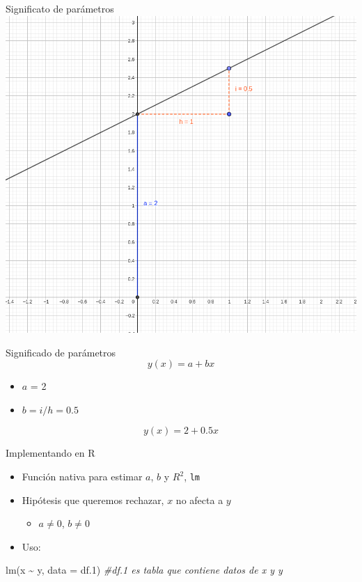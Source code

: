 \documentclass[
  11pt,
  ignorenonframetext,
]{beamer}
\newenvironment{Shaded}{}{}
\newcommand{\AttributeTok}[1]{\textcolor[rgb]{0.49,0.56,0.16}{#1}}
\newcommand{\CommentTok}[1]{\textcolor[rgb]{0.38,0.63,0.69}{\textit{#1}}}
\newcommand{\FloatTok}[1]{\textcolor[rgb]{0.25,0.63,0.44}{#1}}
\newcommand{\FunctionTok}[1]{\textcolor[rgb]{0.02,0.16,0.49}{#1}}
\newcommand{\NormalTok}[1]{#1}
\newcommand{\SpecialCharTok}[1]{\textcolor[rgb]{0.25,0.44,0.63}{#1}}
\providecommand{\tightlist}{%
  \setlength{\itemsep}{0pt}\setlength{\parskip}{0pt}}
\begin{document}
\begin{frame}{Significato de parámetros}
\protect\hypertarget{significato-de-paruxe1metros}{}
\includegraphics{La-recta.png}
\end{frame}

\begin{frame}{Significado de parámetros}
\protect\hypertarget{significado-de-paruxe1metros}{}
\[y(x) = a + bx\]

\begin{itemize}
\item
  \(a\) = 2
\item
  \(b = i/h = 0.5\)
\end{itemize}

\[y(x) = 2 + 0.5 x\]
\end{frame}

\begin{frame}[fragile]{Implementando en R}
\protect\hypertarget{implementando-en-r}{}
\begin{itemize}
\item
  Función nativa para estimar \(a\), \(b\) y \(R^2\), \texttt{lm}
\item
  Hipótesis que queremos rechazar, \(x\) no afecta a \(y\)

  \begin{itemize}
  \tightlist
  \item
    \(a \neq 0\), \(b \neq 0\)
  \end{itemize}
\item
  Uso:
\end{itemize}

\begin{Shaded}
\begin{Highlighting}[]
\FunctionTok{lm}\NormalTok{(x }\SpecialCharTok{\textasciitilde{}}\NormalTok{ y, }\AttributeTok{data =}\NormalTok{ df}\FloatTok{.1}\NormalTok{) }\CommentTok{\#df.1 es tabla que contiene datos de x y y}
\end{Highlighting}
\end{Shaded}
\end{frame}
\end{document}
